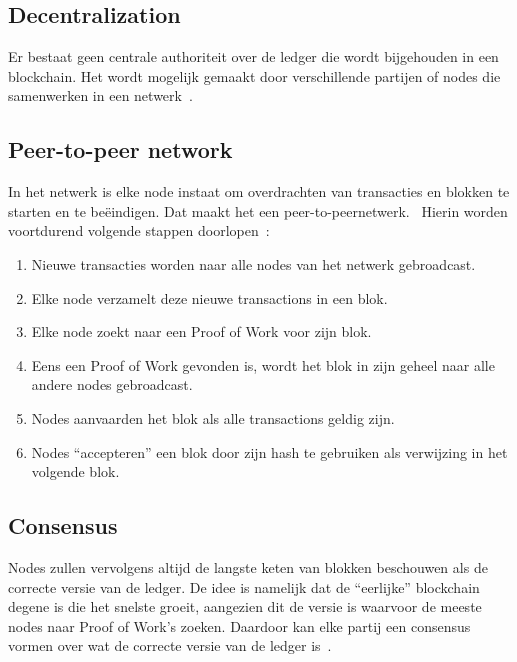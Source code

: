 \subsection{Decentralization}
\label{sub:decentralization}

Er bestaat geen centrale authoriteit over de ledger die wordt bijgehouden in een blockchain. Het wordt mogelijk gemaakt door verschillende partijen of nodes die samenwerken in een netwerk~\autocite{Anita2019}.

\subsection{Peer-to-peer network}
\label{sub:peer-to-peer-network}

In het netwerk is elke node instaat om overdrachten van transacties en blokken te starten en te beëindigen. Dat maakt het een peer-to-peernetwerk.~\autocite{Davidson2016} Hierin worden voortdurend volgende stappen doorlopen~\autocite{Nakamoto2008}:

\begin{enumerate}
	\item Nieuwe transacties worden naar alle nodes van het netwerk gebroadcast.
	\item Elke node verzamelt deze nieuwe transactions in een blok.
	\item Elke node zoekt naar een Proof of Work voor zijn blok.
	\item Eens een Proof of Work gevonden is, wordt het blok in zijn geheel naar alle andere nodes gebroadcast.
	\item Nodes aanvaarden het blok als alle transactions geldig zijn.
	\item Nodes ``accepteren'' een blok door zijn hash te gebruiken als verwijzing in het volgende blok.
\end{enumerate}

\subsection{Consensus}
\label{sub:consensus}

Nodes zullen vervolgens altijd de langste keten van blokken beschouwen als de correcte versie van de ledger. De idee is namelijk dat de ``eerlijke'' blockchain degene is die het snelste groeit, aangezien dit de versie is waarvoor de meeste nodes naar Proof of Work's zoeken. Daardoor kan elke partij een consensus vormen over wat de correcte versie van de ledger is~\autocite{Anita2019}.

